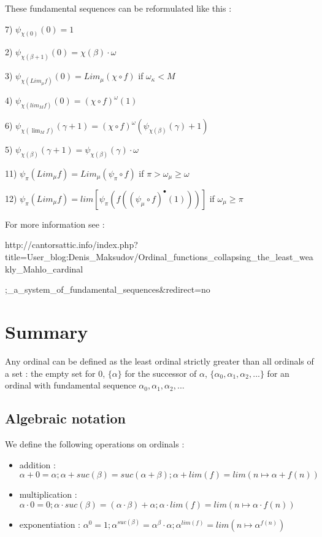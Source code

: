 \documentclass[10pt]{article}
\begin{document}
\bigskip

These fundamental sequences can be reformulated like this :

7) \( \psi_{\chi(0)}(0) = 1 \)

2) \( \psi_{\chi(\beta+1)}(0) = \chi(\beta) \cdot \omega \)

3) \( \psi_{\chi(Lim_\mu f)}(0) = Lim_\mu(\chi \circ f) \) if \( \omega_\kappa < M \)

4) \( \psi_{\chi(lim_M f)}(0) = (\chi \circ f)^\omega (1) \)

6) \( \psi_{\chi(\lim_M f)}(\gamma+1) = (\chi \circ f)^\omega (\psi_{\chi(\beta)}(\gamma)+1) \)

5) \( \psi_{\chi(\beta)}(\gamma+1) = \psi_{\chi(\beta)}(\gamma) \cdot \omega \)

11) \( \psi_\pi (Lim_\mu f) = Lim_\mu (\psi_\pi \circ f) \) if \( \pi > \omega_\mu \ge \omega \)

12) \( \psi_\pi (Lim_\mu f) = lim [\psi_\pi(f((\psi_\mu \circ f)^\bullet(1)))] \) if \( \omega_\mu \ge \pi \)

\bigskip

For more information see :

http://cantorsattic.info/index.php?title=User\_blog:Denis\_Maksudov/Ordinal\_functions\_collapsing\_the\_least\_weakly\_Mahlo\_cardinal

;\_a\_system\_of\_fundamental\_sequences\&redirect=no


\section{Summary}

Any ordinal can be defined as the least ordinal strictly greater than all ordinals of a set : the empty set for 0, \(\lbrace \alpha \rbrace\) for the successor of \( \alpha \),  \(\lbrace \alpha_0,\alpha_1,\alpha_2,...\rbrace\) for an ordinal with fundamental sequence \(\alpha_0, \alpha_1, \alpha_2, ...\)

\subsection{Algebraic notation}

We define the following operations on ordinals :

\smallskip
\begin{itemize}
     \setlength{\itemsep}{1pt}
     \setlength{\parskip}{0pt}
     \setlength{\parsep}{0pt}
\item addition : \( \alpha+0=\alpha ; \alpha+suc(\beta)=suc(\alpha+\beta); \alpha+lim(f)=lim(n \mapsto \alpha+f(n)) \)

\item multiplication : \( \alpha \cdot 0 = 0 ; \alpha \cdot suc(\beta) = (\alpha \cdot \beta) + \alpha ; \alpha \cdot lim(f) = lim (n \mapsto \alpha \cdot f(n)) \)

\item exponentiation : \( \alpha^0 = 1 ; \alpha^{suc(\beta)} = \alpha^\beta \cdot \alpha ; \alpha^{lim(f)} = lim (n \mapsto \alpha^{f(n)}) \)
\end{itemize}
\end{document}
